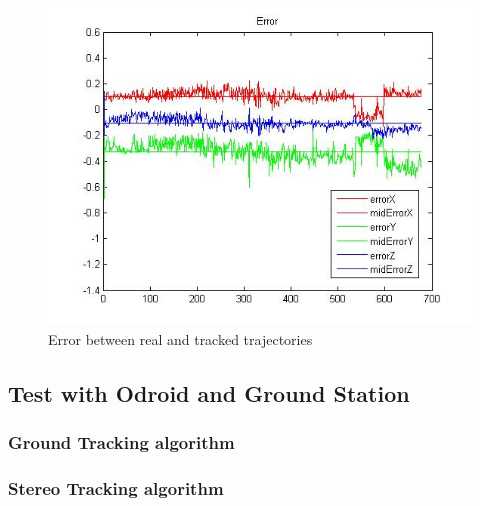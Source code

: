 	\begin{figure}[htp]
		\centering
		\includegraphics[width=0.7\linewidth]{../Images/c4/errors_stereo}
		\caption{Error between real and tracked trajectories}
		\label{fig:errors_stereo_PC}
	\end{figure}	
	
	\newpage
	
\subsection{Test with Odroid and Ground Station}
	\label{test_with_odroid_and_GT}

	\subsubsection{Ground Tracking algorithm}
	
	\subsubsection{Stereo Tracking algorithm}